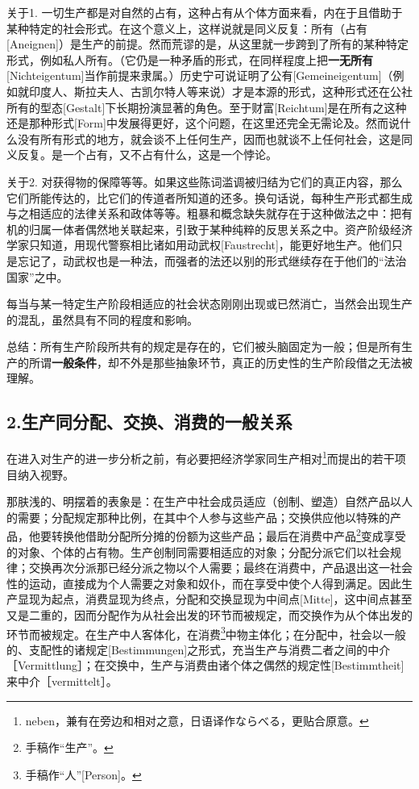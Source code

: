 \documentclass[a4paper,twoside,12pt]{ctexart}
\begin{document}
关于1. 一切生产都是对自然的占有，这种占有从个体方面来看，内在于且借助于某种特定的社会形式。在这个意义上，这样说就是同义反复：所有（占有[Aneignen]）是生产的前提。然而荒谬的是，从这里就一步跨到了所有的某种特定形式，例如私人所有。（它仍是一种矛盾的形式，在同样程度上把\textbf{一无所有}[Nichteigentum]当作前提来隶属。）历史宁可说证明了公有[Gemeineigentum]（例如就印度人、斯拉夫人、古凯尔特人等来说）才是本源的形式，这种形式还在公社所有的型态[Gestalt]下长期扮演显著的角色。至于财富[Reichtum]是在所有之这种还是那种形式[Form]中发展得更好，这个问题，在这里还完全无需论及。然而说什么没有所有形式的地方，就会谈不上任何生产，因而也就谈不上任何社会，这是同义反复。是一个占有，又不占有什么，这是一个悖论。

关于2. 对获得物的保障等等。如果这些陈词滥调被归结为它们的真正内容，那么它们所能传达的，比它们的传道者所知道的还多。换句话说，每种生产形式都生成与之相适应的法律关系和政体等等。粗暴和概念缺失就存在于这种做法之中：把有机的归属一体者偶然地关联起来，引致于某种纯粹的反思关系之中。资产阶级经济学家只知道，用现代警察相比诸如用动武权[Faustrecht]，能更好地生产。他们只是忘记了，动武权也是一种法，而强者的法还以别的形式继续存在于他们的“法治国家”之中。

每当与某一特定生产阶段相适应的社会状态刚刚出现或已然消亡，当然会出现生产的混乱，虽然具有不同的程度和影响。

总结：所有生产阶段所共有的规定是存在的，它们被头脑固定为一般；但是所有生产的所谓\textbf{一般条件}，却不外是那些抽象环节，真正的历史性的生产阶段借之无法被理解。

\newpage

\subsection{2.生产同分配、交换、消费的一般关系}

在进入对生产的进一步分析之前，有必要把经济学家同生产相对\footnote{neben，兼有在旁边和相对之意，日语译作ならべる，更贴合原意。}而提出的若干项目纳入视野。

那肤浅的、明摆着的表象是：在生产中社会成员适应（创制、塑造）自然产品以人的需要；分配规定那种比例，在其中个人参与这些产品；交换供应他以特殊的产品，他要转换他借助分配所分摊的份额为这些产品；最后在消费中产品\footnote{手稿作“生产”。}变成享受的对象、个体的占有物。生产创制同需要相适应的对象；分配分派它们以社会规律；交换再次分派那已经分派之物以个人需要；最终在消费中，产品退出这一社会性的运动，直接成为个人需要之对象和奴仆，而在享受中使个人得到满足。因此生产显现为起点，消费显现为终点，分配和交换显现为中间点[Mitte]，这中间点甚至又是二重的，因而分配作为从社会出发的环节而被规定，而交换作为从个体出发的环节而被规定。在生产中人客体化，在消费\footnote{手稿作“人”[Person]。}中物主体化；在分配中，社会以一般的、支配性的诸规定[Bestimmungen]之形式，充当生产与消费二者之间的中介［Vermittlung］；在交换中，生产与消费由诸个体之偶然的规定性[Bestimmtheit]来中介［vermittelt］。
\end{document}
